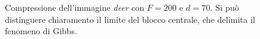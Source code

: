\begin{figure}%
	\centering
	\caption{Compressione dell'immagine \textit{deer} con $F=200$ e $d=70$. Si può distinguere chiaramento il limite del blocco centrale, che delimita il fenomeno di Gibbs.}%
	\label{fig:gibbs}
\end{figure}

